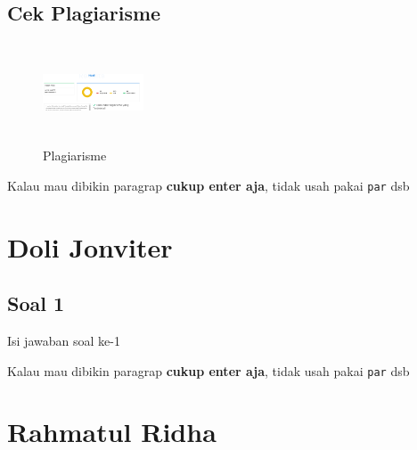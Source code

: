\subsection{Cek Plagiarisme}
\begin{figure}[!htbp]
\centering
\includegraphics[width=3cm,height=3cm]{figures/4/1174005/plagiat.PNG}
\caption{Plagiarisme}
\label{plagiarisme}\end{figure}




Kalau mau dibikin paragrap \textbf{cukup enter aja}, tidak usah pakai \verb|par| dsb



\section{Doli Jonviter}
\subsection{Soal 1}
Isi jawaban soal ke-1

Kalau mau dibikin paragrap \textbf{cukup enter aja}, tidak usah pakai \verb|par| dsb



\section{Rahmatul Ridha}
